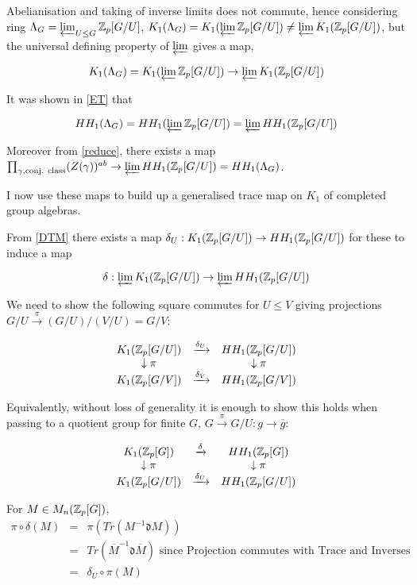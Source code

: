 Abelianisation and taking of inverse limits does not commute, hence considering ring $\Lambda_G = \varprojlim_{U\leq G} \mathbb Z_p [ G/U]$, $K_1(\Lambda_G) = K_1{(\varprojlim \mathbb Z_p [ G/U])}\neq \varprojlim K_1(\mathbb Z_p [ G/U])$, but the universal defining property of $\varprojlim$ gives a map,

$$K_1(\Lambda_G) = K_1{(\varprojlim \mathbb Z_p [ G/U])}\rightarrow \varprojlim K_1(\mathbb Z_p [ G/U])$$

It was shown in \ref{ET} that 

$$HH_1(\Lambda_G) = HH_1{(\varprojlim \mathbb Z_p [ G/U])} = \varprojlim HH_1(\mathbb Z_p [ G/U])$$

Moreover from \ref{reduce}, there exists a map $\prod_{\gamma , \text{conj. class}} (Z(\gamma))^{ab}\rightarrow  \varprojlim HH_1(\mathbb Z_p [ G/U]) = HH_1(\Lambda_G)$.

I now use these maps to build up a generalised trace map on $K_1$ of  completed group algebras.

From \ref{DTM} there exists a map $\delta_U : K_1(\mathbb Z_p [ G/U])\rightarrow  HH_1(\mathbb Z_p [ G/U])$ for these to induce a map

$$ \delta : \varprojlim  K_1(\mathbb Z_p [ G/U])\rightarrow  \varprojlim  HH_1(\mathbb Z_p [ G/U])$$

We need to show the following square commutes for $U\leq V$ giving projections $G/ U \xrightarrow{\pi} (G/U) / (V/U) = G/V$:

$$\begin{array}{ccc}
   K_1(\mathbb Z_p [ G/U])&  \xrightarrow{\delta_U}& HH_1(\mathbb Z_p [ G/U])  \\
  \downarrow \pi&   &   \downarrow \pi\\
   K_1(\mathbb Z_p [ G/V])&  \xrightarrow{\delta_V} &HH_1(\mathbb Z_p [ G/V])   
\end{array}
$$

Equivalently,  without loss of generality it is enough to show this holds when passing to a quotient group for finite $G$, $G\xrightarrow{\pi}G/U:g\rightarrow \overline g$:

$$\begin{array}{ccc}
   K_1(\mathbb Z_p [ G])&  \xrightarrow{\delta}& HH_1(\mathbb Z_p [ G])  \\
  \downarrow \pi&   &   \downarrow \pi\\
   K_1(\mathbb Z_p [ G/U])&  \xrightarrow{\delta_U} &HH_1(\mathbb Z_p [ G/U])   
\end{array}
$$

For $M\in M_n(\mathbb Z_p[G])$, 
\begin{eqnarray}
\nonumber \pi \circ \delta (M) &=& \pi (Tr(M^{-1}\mathfrak d  M))\\
\nonumber                                &=& Tr({\overline M}^{-1}\mathfrak d  \overline M) \text{ since Projection commutes with Trace and Inverses}\\
\nonumber                                &=& \delta_U\circ \pi (M)
\end{eqnarray} 

